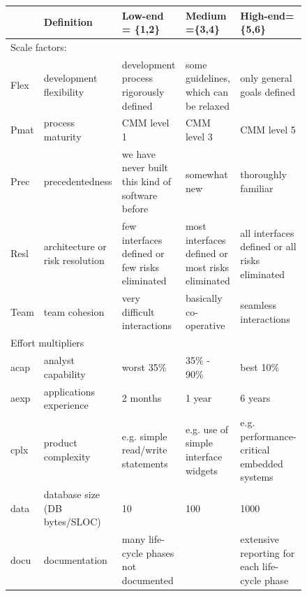 \documentclass{sig-alternate}
\begin{document}
 \begin{figure}[!t]
{\scriptsize
\begin{center}
\begin{tabular}{|p{0.5in}|p{1.4in}|p{1.3in}|p{1.3in}|p{1.3in}|}\hline

 & Definition & Low-end = \{1,2\}
 &Medium =\{3,4\} &High-end= \{5,6\} \\\hline


\multicolumn{5}{l}{Scale factors:}\\\hline
Flex   &  development flexibility   & development process
rigorously defined & some guidelines, which can be relaxed & only
general goals defined\\\hline

Pmat    & process maturity  &  CMM level 1 &   CMM level 3  &  CMM level 5 \\\hline

Prec & precedentedness  &  we have never built this kind
of software before &    somewhat new &
thoroughly familiar \\\hline

Resl &  architecture or risk resolution  &  few interfaces
defined or few risks eliminated  &  most interfaces defined or most
risks eliminated   & all interfaces defined or all risks
eliminated\\\hline

Team  &   team cohesion  &  very difficult interactions &
basically co-operative  &  seamless interactions\\\hline


\multicolumn{5}{l}{Effort multipliers}\\\hline
acap  &  analyst capability  &  worst 35\% &   35\% - 90\% &  best 10\% \\\hline

aexp   &  applications experience  &  2 months &   1 year  &  6 years\\\hline

cplx   &  product complexity   & e.g. simple read/write
statements & e.g. use of simple interface widgets  &  e.g.
performance-critical embedded systems\\\hline

data   &  database size 
(DB bytes/SLOC) &
10 & 100 &    1000 \\\hline

docu   &  documentation   & many life-cycle phases not
documented      & &  extensive reporting for each life-cycle phase\\\hline


\end{tabular}
\end{center}}
\end{figure}
\end{document}

